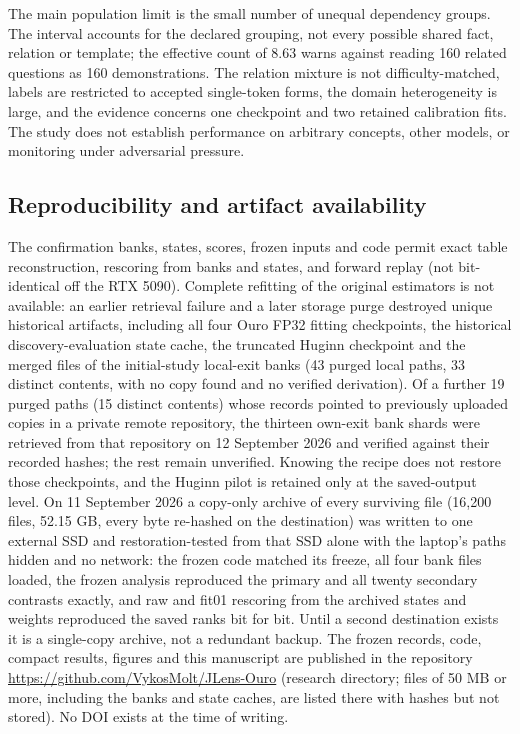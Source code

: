 The main population limit is the small number of unequal dependency
groups. The interval accounts for the declared grouping, not every
possible shared fact, relation or template; the effective count of 8.63
warns against reading 160 related questions as 160 demonstrations. The
relation mixture is not difficulty-matched, labels are restricted to
accepted single-token forms, the domain heterogeneity is large, and the
evidence concerns one checkpoint and two retained calibration fits. The
study does not establish performance on arbitrary concepts, other
models, or monitoring under adversarial pressure.

\subsection{Reproducibility and artifact
availability}\label{reproducibility-and-artifact-availability}

The confirmation banks, states, scores, frozen inputs and code permit
exact table reconstruction, rescoring from banks and states, and forward
replay (not bit-identical off the RTX 5090). Complete refitting of the
original estimators is not available: an earlier retrieval failure and a
later storage purge destroyed unique historical artifacts, including all
four Ouro FP32 fitting checkpoints, the historical discovery-evaluation
state cache, the truncated Huginn checkpoint and the merged files of the
initial-study local-exit banks (43 purged local paths, 33 distinct
contents, with no copy found and no verified derivation). Of a further
19 purged paths (15 distinct contents) whose records pointed to
previously uploaded copies in a private remote repository, the thirteen
own-exit bank shards were retrieved from that repository on 12 September
2026 and verified against their recorded hashes; the rest remain
unverified. Knowing the recipe does not restore those checkpoints, and
the Huginn pilot is retained only at the saved-output level. On 11
September 2026 a copy-only archive of every surviving file (16,200
files, 52.15 GB, every byte re-hashed on the destination) was written to
one external SSD and restoration-tested from that SSD alone with the
laptop's paths hidden and no network: the frozen code matched its
freeze, all four bank files loaded, the frozen analysis reproduced the
primary and all twenty secondary contrasts exactly, and raw and fit01
rescoring from the archived states and weights reproduced the saved
ranks bit for bit. Until a second destination exists it is a single-copy
archive, not a redundant backup. The frozen records, code, compact
results, figures and this manuscript are published in the repository
\url{https://github.com/VykosMolt/JLens-Ouro} (research directory; files
of 50 MB or more, including the banks and state caches, are listed there
with hashes but not stored). No DOI exists at the time of writing.

